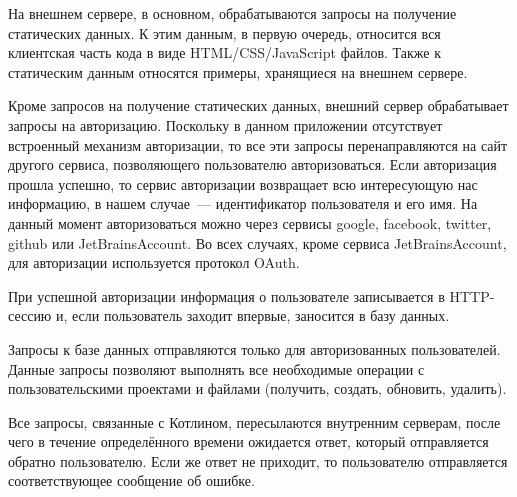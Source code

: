 	На внешнем сервере, в основном, обрабатываются запросы на получение статических данных. К этим данным, в первую очередь, относится вся клиентская часть кода в виде HTML/CSS/JavaScript файлов. Также к статическим данным относятся примеры, хранящиеся на внешнем сервере.
	
	Кроме запросов на получение статических данных, внешний сервер обрабатывает запросы на авторизацию. Поскольку в данном приложении отсутствует встроенный механизм авторизации, то все эти запросы перенаправляются на сайт другого сервиса, позволяющего пользователю авторизоваться. Если авторизация прошла успешно, то сервис авторизации возвращает всю интересующую нас информацию, в нашем случае~--- идентификатор пользователя и его имя. На данный момент авторизоваться можно через сервисы google, facebook, twitter, github или JetBrainsAccount. Во всех случаях, кроме сервиса JetBrainsAccount, для авторизации используется протокол OAuth.
	
	
	При успешной авторизации информация о пользователе записывается в HTTP-сессию и, если пользователь заходит впервые, заносится в базу данных.
	
	
	Запросы к базе данных отправляются только для авторизованных пользователей. Данные запросы позволяют выполнять все необходимые операции с пользовательскими проектами и файлами (получить, создать, обновить, удалить).
	
	Все запросы, связанные с Котлином, пересылаются внутренним серверам, после чего в течение определённого времени ожидается ответ, который отправляется обратно пользователю. Если же ответ не приходит, то пользователю отправляется соответствующее сообщение об ошибке.
	
	

